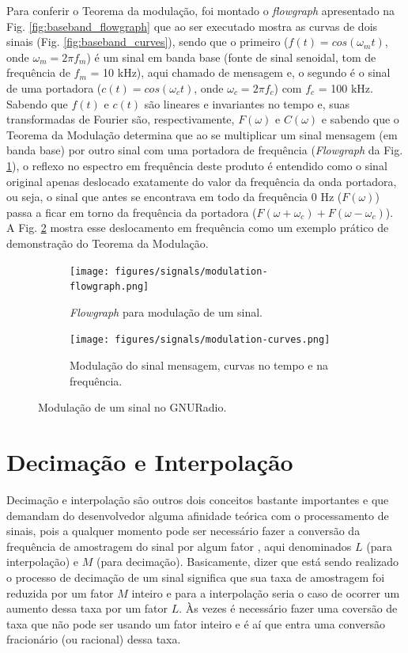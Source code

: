 \documentclass[
  12pt,				%
  openright,			%
  twoside,			%
  a4paper,			%
  english,			%
  french,				%
  spanish,			%
  brazil,				%
  ]{abntex2}
\begin{document}
Para conferir o Teorema da modulação, foi montado o \textit{flowgraph} apresentado na Fig. \ref{fig:baseband_flowgraph} que ao ser executado mostra as curvas de dois sinais (Fig. \ref{fig:baseband_curves}), sendo que o
primeiro ($f(t) = cos(\omega_mt)$, onde $\omega_m = 2 \pi f_m$) é um sinal em banda base (fonte de sinal senoidal, tom de frequência de $f_m$ = 10 kHz), aqui chamado de mensagem e, o segundo é
o sinal de uma portadora ($c(t) = cos(\omega_ct)$, onde $\omega_c = 2 \pi f_c$) com $f_c$ = 100 kHz. Sabendo que $f(t)$ e $c(t)$ são lineares e invariantes no tempo e, suas transformadas de Fourier
são, respectivamente, $F(\omega)$ e $C(\omega)$ e sabendo que o Teorema da Modulação \cite{Lathi:1998} determina que ao se multiplicar um sinal mensagem (em banda base) por outro sinal com uma portadora de frequência (\textit{Flowgraph} da
Fig. \ref{fig:modulation_flowgraph}), o reflexo no espectro em frequência deste produto é entendido como o sinal original apenas deslocado exatamente do valor da frequência da onda portadora, ou
seja, o sinal que antes se encontrava em todo da frequência 0 Hz ($F(\omega)$) passa a ficar em torno da frequência da portadora ($F(\omega + \omega_c) + F(\omega - \omega_c)$). A
Fig. \ref{fig:modulation_curves} mostra esse deslocamento em frequência como um exemplo prático de demonstração do Teorema da Modulação.

\begin{figure}[!htb]
  \centering
  \begin{subfigure}[b]{0.8\linewidth}
    \centering
    \caption{\textit{Flowgraph} para modulação de um sinal.}
    \texttt{[image: figures/signals/modulation-flowgraph.png]}
    \label{fig:modulation_flowgraph}
  \end{subfigure}

  \begin{subfigure}[b]{0.8\linewidth}
    \centering
    \caption{Modulação do sinal mensagem, curvas no tempo e na frequência.}
    \texttt{[image: figures/signals/modulation-curves.png]}
    \label{fig:modulation_curves}
  \end{subfigure}
  \caption{Modulação de um sinal no GNURadio.}
  \label{fig:modulation_signals}
\end{figure}

\newpage
\section*{Decimação e Interpolação}

Decimação e interpolação são outros dois conceitos bastante importantes e que demandam do desenvolvedor alguma afinidade teórica com o processamento de sinais, pois a qualquer momento pode ser
necessário fazer a conversão da frequência de amostragem do sinal por algum fator \cite{hayes:1999}, aqui denominados $L$ (para interpolação) e $M$ (para decimação). Basicamente, dizer que está sendo realizado o processo
de decimação de um sinal significa que sua taxa de amostragem foi reduzida por um fator $M$ inteiro e para a interpolação seria o caso de ocorrer um aumento dessa taxa por um fator $L$.
Às vezes é necessário fazer uma coversão de taxa que não pode ser usando um fator inteiro e é aí que entra uma conversão fracionário (ou racional) dessa taxa.
\end{document}
